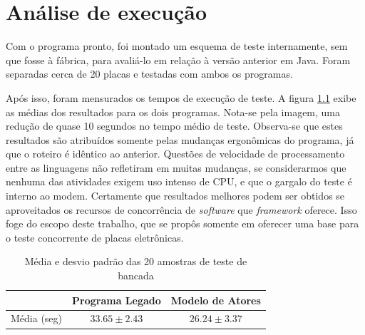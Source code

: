     
        \clearpage
    \clearpage
    \chapter{Análise de execução}
    
        Com o programa pronto, foi montado um esquema de teste internamente, sem que fosse à fábrica, para avaliá-lo em relação à versão anterior em Java. Foram separadas cerca de 20 placas e testadas com ambos os programas.
        
        Após isso, foram mensurados os tempos de execução de teste. A figura \ref{tab:resultado} exibe as médias dos resultados para os dois programas. Nota-se pela imagem, uma redução de quase 10 segundos no tempo médio de teste. Observa-se que estes resultados são atribuídos somente pelas mudanças ergonômicas do programa, já que o roteiro é idêntico ao anterior. Questões de velocidade de processamento entre as linguagens não refletiram em muitas mudanças, se considerarmos que nenhuma das atividades exigem uso intenso de CPU, e que o gargalo do teste é interno ao modem. Certamente que resultados melhores podem ser obtidos se aproveitados os recursos de concorrência de \textit{software} que \textit{framework} oferece. Isso foge do escopo deste trabalho, que se propôs somente em oferecer uma base para o teste concorrente de placas eletrônicas.
        
    \begin{table}[]
        \centering
        \caption{Média e desvio padrão das 20 amostras de teste de bancada}
        \label{tab:resultado}
        \begin{tabular}{l|cc}
        
                          & Programa Legado & Modelo de Atores \\
    \hline
            Média (seg)         & $33.65\pm2.43$          & $26.24\pm3.37$                          \\
        \end{tabular}
        \end{table}
        
